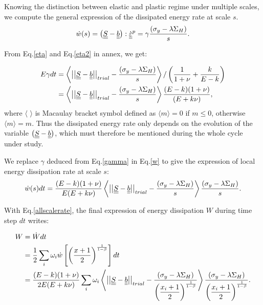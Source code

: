 Knowing the distinction between elastic and plastic regime under multiple scales, we compute the general expression of the dissipated energy rate at scale $s$.
\begin{equation}
\dot{w}(s)=\left( \uline{\uline{S}}-\uline{\uline{b}}\right) :\dot{\uline{\uline{\varepsilon}}}^p=\gamma\dfrac{  \left(\sigma_y-\lambda \Sigma_H\right)}{s}.
\label{w}
\end{equation}

From Eq.\eqref{eta} and Eq.\eqref{eta2} in annex, we get:

\begin{equation}
	\begin{split}
		E\gamma dt&=\left\langle \left| \left|\uline{\uline{S}}-\uline{\uline{b}}\right| \right|_{trial}-\dfrac{ \left(\sigma_y-\lambda \Sigma_H\right)}{s}\right\rangle /\left(\dfrac{1}{1+\nu}+\dfrac{k}{E-k} \right)
		\\&=\left\langle \left| \left|\uline{\uline{S}}-\uline{\uline{b}}\right| \right|_{trial}-\dfrac{ \left(\sigma_y-\lambda \Sigma_H\right)}{s}\right\rangle\dfrac{(E-k)(1+\nu) }{(E+k\nu)},
	\end{split}
	\label{gamma}
\end{equation}
where $\langle$ $\rangle$ is Macaulay bracket symbol defined as $\langle m\rangle=0$ if $m\leqslant0$, otherwise $\langle m\rangle=m$. Thus the dissipated energy rate only depends on the evolution of the variable $\left( \uline{\uline{S}}-\uline{\uline{b}}\right)$, which must therefore be mentioned during the whole cycle under study.

We replace $\gamma$ deduced from Eq.\eqref{gamma} in Eq.\eqref{w} to give the expression of local energy dissipation rate at scale $s$:
\begin{equation}
\dot{w}(s)dt=\dfrac{(E-k)(1+\nu) }{E(E+k\nu)}\left\langle  \left| \left|\uline{\uline{S}}-\uline{\uline{b}}\right| \right|_{trial}-\dfrac{ \left(\sigma_y-\lambda \Sigma_H\right)}{s}\right\rangle \dfrac{ \left(\sigma_y-\lambda \Sigma_H\right)}{s}.
\label{dW}
\end{equation}

With Eq.\eqref{allscalerate}, the final expression of energy dissipation $W$ during time step $dt$ writes:

\begin{equation}
\begin{split}
W&=\dot{W}dt
\\&=\frac{1}{2}\sum_{i}\omega_i\dot{w}\left[  \left( \frac{x+1}{2}\right) ^{\frac{1}{1-\beta}}\right]dt
\\&=\dfrac{(E-k)(1+\nu) }{2E(E+k\nu)}\sum_{i}\omega_i\left\langle  \left| \left|\uline{\uline{S}}-\uline{\uline{b}}\right| \right|_{trial}-\dfrac{\left(\sigma_y-\lambda \Sigma_H\right) }{\left( \dfrac{x_i+1}{2}\right) ^{\frac{1}{1-\beta}}}\right\rangle \dfrac{\left(\sigma_y-\lambda \Sigma_H\right) }{\left( \dfrac{x_i+1}{2}\right)^{\frac{1}{1-\beta}}}.
\end{split}
\label{finaldw}
\end{equation}

